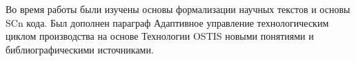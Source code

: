 
Во время работы были изучены основы формализации научных текстов и основы SCn кода. Был дополнен параграф Адаптивное управление технологическим циклом производства на основе Технологии OSTIS новыми понятиями и библиографическими источниками.